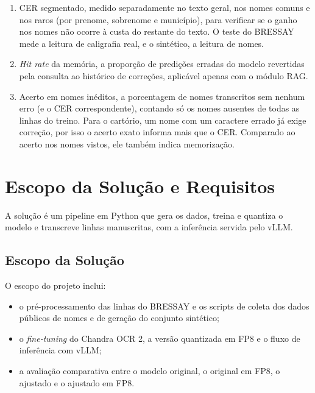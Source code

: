 \documentclass[12pt,a4paper]{article}
\begin{document}
\begin{enumerate}
    \item CER segmentado, medido separadamente no texto geral, nos nomes comuns e nos raros (por prenome, sobrenome e município), para verificar se o ganho nos nomes não ocorre à custa do restante do texto. O teste do BRESSAY mede a leitura de caligrafia real, e o sintético, a leitura de nomes.
    \item \emph{Hit rate} da memória, a proporção de predições erradas do modelo revertidas pela consulta ao histórico de correções, aplicável apenas com o módulo RAG.
    \item Acerto em nomes inéditos, a porcentagem de nomes transcritos sem nenhum erro (e o CER correspondente), contando só os nomes ausentes de todas as linhas do treino. Para o cartório, um nome com um caractere errado já exige correção, por isso o acerto exato informa mais que o CER. Comparado ao acerto nos nomes vistos, ele também indica memorização.
\end{enumerate}

\section{Escopo da Solução e Requisitos}
\label{sec:escopo}

A solução é um pipeline em Python que gera os dados, treina e quantiza o modelo e transcreve linhas manuscritas, com a inferência servida pelo vLLM.

\subsection{Escopo da Solução}

O escopo do projeto inclui:
\begin{itemize}
    \item o pré-processamento das linhas do BRESSAY e os scripts de coleta dos dados públicos de nomes e de geração do conjunto sintético;
    \item o \emph{fine-tuning} do Chandra OCR 2, a versão quantizada em FP8 e o fluxo de inferência com vLLM;
    \item a avaliação comparativa entre o modelo original, o original em FP8, o ajustado e o ajustado em FP8.
\end{itemize}
\end{document}
